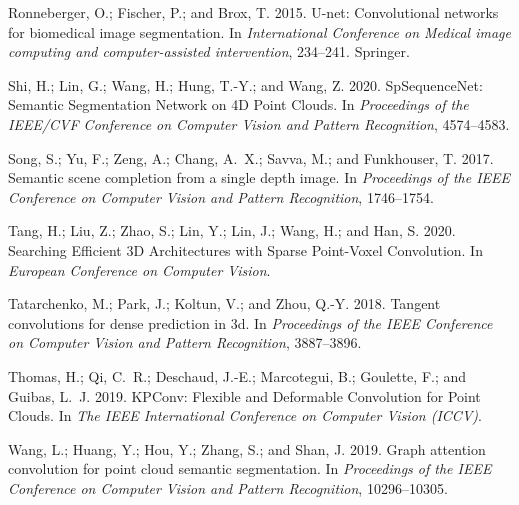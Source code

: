 \documentclass[letterpaper]{article} \usepackage{aaai21}  \usepackage{times}  \usepackage{helvet} \usepackage{courier}  \usepackage[hyphens]{url}  \usepackage{graphicx} \urlstyle{rm} \def\UrlFont{\rm}  \usepackage{natbib}  \usepackage{booktabs}
\begin{document}
\begin{thebibliography}{48}
Ronneberger, O.; Fischer, P.; and Brox, T. 2015.
\newblock U-net: Convolutional networks for biomedical image segmentation.
\newblock In \emph{International Conference on Medical image computing and
  computer-assisted intervention}, 234--241. Springer.

Shi, H.; Lin, G.; Wang, H.; Hung, T.-Y.; and Wang, Z. 2020.
\newblock SpSequenceNet: Semantic Segmentation Network on 4D Point Clouds.
\newblock In \emph{Proceedings of the IEEE/CVF Conference on Computer Vision
  and Pattern Recognition}, 4574--4583.

Song, S.; Yu, F.; Zeng, A.; Chang, A.~X.; Savva, M.; and Funkhouser, T. 2017.
\newblock Semantic scene completion from a single depth image.
\newblock In \emph{Proceedings of the IEEE Conference on Computer Vision and
  Pattern Recognition}, 1746--1754.

Tang, H.; Liu, Z.; Zhao, S.; Lin, Y.; Lin, J.; Wang, H.; and Han, S. 2020.
\newblock Searching Efficient 3D Architectures with Sparse Point-Voxel
  Convolution.
\newblock In \emph{European Conference on Computer Vision}.

Tatarchenko, M.; Park, J.; Koltun, V.; and Zhou, Q.-Y. 2018.
\newblock Tangent convolutions for dense prediction in 3d.
\newblock In \emph{Proceedings of the IEEE Conference on Computer Vision and
  Pattern Recognition}, 3887--3896.

Thomas, H.; Qi, C.~R.; Deschaud, J.-E.; Marcotegui, B.; Goulette, F.; and
  Guibas, L.~J. 2019.
\newblock KPConv: Flexible and Deformable Convolution for Point Clouds.
\newblock In \emph{The IEEE International Conference on Computer Vision
  (ICCV)}.

Wang, L.; Huang, Y.; Hou, Y.; Zhang, S.; and Shan, J. 2019{}.
\newblock Graph attention convolution for point cloud semantic segmentation.
\newblock In \emph{Proceedings of the IEEE Conference on Computer Vision and
  Pattern Recognition}, 10296--10305.


\end{thebibliography}
\end{document}
